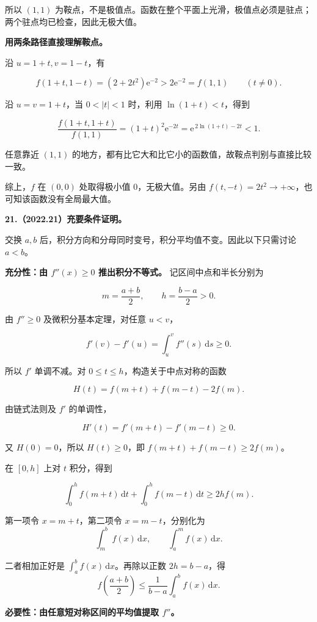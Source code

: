 \documentclass[UTF8,11pt,fontset=windows]{ctexart}
\begin{document}
所以 $(1,1)$ 为鞍点，不是极值点。函数在整个平面上光滑，极值点必须是驻点；两个驻点均已检查，因此无极大值。

\textbf{用两条路径直接理解鞍点。}

沿 $u=1+t,v=1-t$，有

$$
f(1+t,1-t)=(2+2t^2)\mathrm e^{-2}>2\mathrm e^{-2}=f(1,1)
\qquad(t\ne0).
$$

沿 $u=v=1+t$，当 $0<|t|<1$ 时，利用 $\ln(1+t)<t$，得到

$$
\frac{f(1+t,1+t)}{f(1,1)}
=(1+t)^2\mathrm e^{-2t}
=\mathrm e^{\,2\ln(1+t)-2t}<1.
$$

任意靠近 $(1,1)$ 的地方，都有比它大和比它小的函数值，故鞍点判别与直接比较一致。

综上，$f$ 在 $(0,0)$ 处取得极小值 $0$，无极大值。另由 $f(t,-t)=2t^2\to+\infty$，也可知该函数没有全局最大值。

\clearpage

\textbf{21.（2022.21）充要条件证明。}

交换 $a,b$ 后，积分方向和分母同时变号，积分平均值不变。因此以下只需讨论 $a<b$。

\textbf{充分性：由 $f''(x)\ge0$ 推出积分不等式。} 记区间中点和半长分别为

$$
m=\frac{a+b}{2},\qquad h=\frac{b-a}{2}>0.
$$

由 $f''\ge0$ 及微积分基本定理，对任意 $u<v$，

$$
f'(v)-f'(u)=\int_u^v f''(s)\,\mathrm ds\ge0.
$$

所以 $f'$ 单调不减。对 $0\le t\le h$，构造关于中点对称的函数

$$
H(t)=f(m+t)+f(m-t)-2f(m).
$$

由链式法则及 $f'$ 的单调性，

$$
H'(t)=f'(m+t)-f'(m-t)\ge0.
$$

又 $H(0)=0$，所以 $H(t)\ge0$，即 $f(m+t)+f(m-t)\ge2f(m)$。

在 $[0,h]$ 上对 $t$ 积分，得到

$$
\int_0^h f(m+t)\,\mathrm dt+\int_0^h f(m-t)\,\mathrm dt
\ge2h f(m).
$$

第一项令 $x=m+t$，第二项令 $x=m-t$，分别化为
$$
\int_m^b f(x)\,\mathrm dx,
\qquad \int_a^m f(x)\,\mathrm dx.
$$

二者相加正好是 $\int_a^b f(x)\,\mathrm dx$。再除以正数 $2h=b-a$，得
$$
\boxed{f\left(\frac{a+b}{2}\right)
\le\frac1{b-a}\int_a^b f(x)\,\mathrm dx}.
$$

\textbf{必要性：由任意短对称区间的平均值提取 $f''$。}
\end{document}
